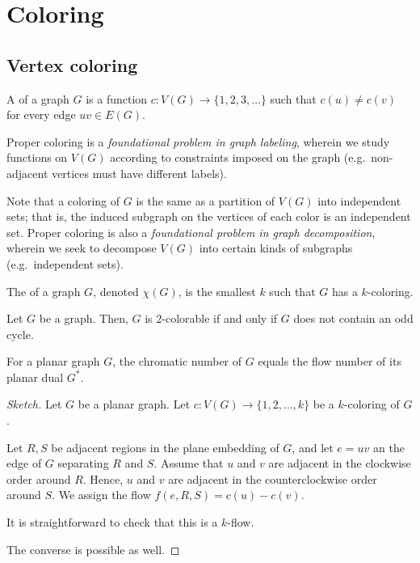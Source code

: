 \chapter{Coloring}

\section{Vertex coloring}

\begin{definition}[Coloring]
    A  of a graph \(G\)
    is a function \(c \colon V(G) \to \{1, 2, 3, \ldots\}\)
    such that \(c(u) \neq c(v)\) for every edge \(uv \in E(G)\).
\end{definition}

Proper coloring is a \emph{foundational problem in graph labeling}, wherein we study functions on \(V(G)\) according to constraints imposed on the graph (e.g.\ non-adjacent vertices must have different labels).

Note that a coloring of \(G\) is the same as a partition of \(V(G)\) into independent sets; that is, the induced subgraph on the vertices of each color is an independent set.
Proper coloring is also a \emph{foundational problem in graph decomposition}, wherein we seek to decompose \(V(G)\) into certain kinds of subgraphs (e.g.\ independent sets).

\begin{definition}
    The  of a graph \(G\), denoted \(\chi(G)\), is the smallest \(k\) such that \(G\) has a \(k\)-coloring.
\end{definition}

\begin{proposition}
    Let \(G\) be a graph.
    Then, \(G\) is \(2\)-colorable if and only if \(G\) does not contain an odd cycle.
\end{proposition}

\begin{proposition}
    For a planar graph \(G\),
    the chromatic number of \(G\)
    equals the flow number of its planar dual \(G^*\).
\end{proposition}

\begin{proof}[Sketch]
    Let \(G\) be a planar graph.
    Let \(c \colon V(G) \to \{1, 2, \ldots, k\}\) be a \(k\)-coloring of \(G\).

    Let \(R, S\) be adjacent regions in the plane embedding of \(G\), and let \(e = uv\) an the edge of \(G\) separating \(R\) and \(S\).
    Assume that \(u\) and \(v\) are adjacent in the clockwise order around \(R\).
    Hence, \(u\) and \(v\) are adjacent in the counterclockwise order around \(S\).
    We assign the flow \(f(e, R, S) = c(u) - c(v)\).

    It is straightforward to check that this is a \(k\)-flow.

    The converse is possible as well.
\end{proof}

